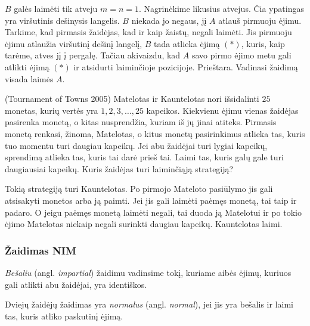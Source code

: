 \begin{sprendimas}
  $B$ galės laimėti tik atveju $m=n=1$. Nagrinėkime likusius atvejus. Čia
  ypatingas yra viršutinis dešinysis langelis. $B$ niekada jo negaus, jį $A$
  atlauš pirmuoju ėjimu. Tarkime, kad pirmasis žaidėjas, kad ir kaip žaistų,
  negali laimėti. Jis pirmuoju ėjimu atlaužia viršutinį dešinį langelį, $B$
  tada atlieka ėjimą $(*)$, kuris, kaip tarėme, atves jį į pergalę. Tačiau
  akivaizdu, kad $A$ savo pirmo ėjimo metu gali atlikti ėjimą $(*)$ ir
  atsidurti laiminčioje pozicijoje. Prieštara. Vadinasi žaidimą visada laimės
  $A$. 
\end{sprendimas}

\begin{pavnr}{(Tournament of Towns 2005)}
  Matelotas ir Kauntelotas nori išsidalinti $25$ monetas, kurių vertės yra $1, 2, 3, \dots
  , 25$ kapeikos. Kiekvienu ėjimu vienas žaidėjas pasirenka monetą, o kitas
  nusprendžia, kuriam iš jų jinai atiteks. Pirmasis monetą renkasi, žinoma,
  Matelotas, o kitus monetų pasirinkimus atlieka tas, kuris tuo momentu turi
  daugiau kapeikų. Jei abu žaidėjai turi lygiai kapeikų, sprendimą atlieka
  tas, kuris tai darė prieš tai. Laimi tas, kuris galų gale turi
  daugiausiai kapeikų.  Kuris žaidėjas turi laiminčiąją strategiją?
\end{pavnr}

\begin{sprendimas}
  Tokią strategiją turi Kauntelotas. Po pirmojo Mateloto pasiūlymo jis gali atsisakyti
  monetos arba ją paimti. Jei jis gali laimėti paėmęs monetą, tai taip ir
  padaro. O jeigu paėmęs monetą laimėti negali, tai duoda ją Matelotui ir po
  tokio ėjimo Matelotas niekaip negali surinkti daugiau kapeikų. Kauntelotas laimi.
\end{sprendimas}

\subsubsection{Žaidimas NIM}

\begin{api}
  \emph{Bešaliu} (angl. \emph{impartial}) žaidimu vadinsime tokį, kuriame aibės ėjimų, kuriuos
  gali atlikti abu žaidėjai, yra identiškos.
\end{api}

\begin{api}
  Dviejų žaidėjų žaidimas yra \emph{normalus} (angl. \emph{normal}), jei jis yra bešalis ir laimi
  tas, kuris atliko paskutinį ėjimą.
\end{api}

